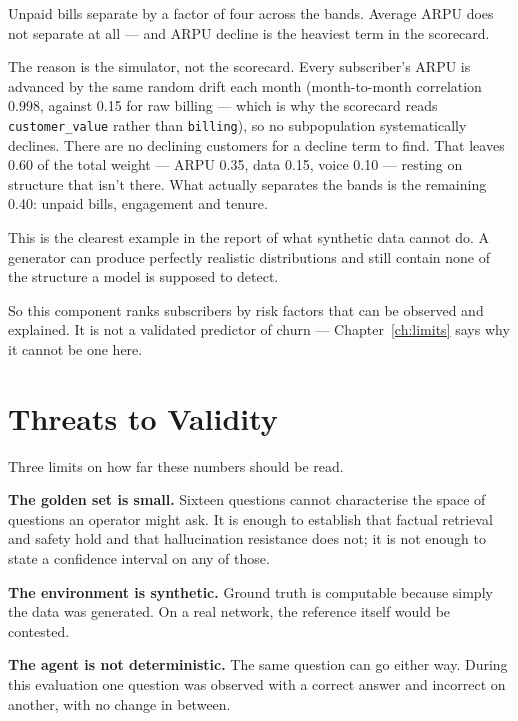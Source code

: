 Unpaid bills separate by a factor of four across the bands. Average ARPU does
not separate at all --- and ARPU decline is the heaviest term in the scorecard.

The reason is the simulator, not the scorecard. Every subscriber's ARPU is
advanced by the same random drift each month (month-to-month correlation 0.998,
against 0.15 for raw billing --- which is why the scorecard reads
\texttt{customer\_value} rather than \texttt{billing}), so no subpopulation
systematically declines. There are no declining customers for a decline term to
find. That leaves 0.60 of the total weight --- ARPU 0.35, data 0.15, voice 0.10
--- resting on structure that isn't there. What actually separates the bands is
the remaining 0.40: unpaid bills, engagement and tenure.

This is the clearest example in the report of what synthetic data cannot do. A
generator can produce perfectly realistic distributions and still contain none
of the structure a model is supposed to detect.

So this component ranks subscribers by risk factors that can be observed and
explained. It is not a validated predictor of churn --- Chapter~\ref{ch:limits}
says why it cannot be one here.


\section{Threats to Validity}

Three limits on how far these numbers should be read.

\textbf{The golden set is small.} Sixteen questions cannot characterise the space
of questions an operator might ask. It is enough to establish that factual
retrieval and safety hold and that hallucination resistance does not; it is not
enough to state a confidence interval on any of those.

\textbf{The environment is synthetic.} Ground truth is computable 
because simply the data was generated. On a real network, the reference itself
would be contested.

\textbf{The agent is not deterministic.} The same question can go either way.
During this evaluation one question was observed with a correct answer and incorrect 
on another, with no change in between. 

